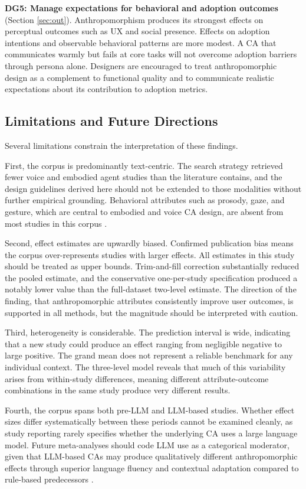 \documentclass[lettersize,journal]{IEEEtran}
\begin{document}
\textbf{DG5: Manage expectations for behavioral and adoption outcomes} (Section \ref{sec:out}). Anthropomorphism produces its strongest effects on perceptual outcomes such as UX and social presence. Effects on adoption intentions and observable behavioral patterns are more modest. A CA that communicates warmly but fails at core tasks will not overcome adoption barriers through persona alone. Designers are encouraged to treat anthropomorphic design as a complement to functional quality and to communicate realistic expectations about its contribution to adoption metrics.

\subsection{Limitations and Future Directions}

Several limitations constrain the interpretation of these findings.

First, the corpus is predominantly text-centric. The search strategy retrieved fewer voice and embodied agent studies than the literature contains, and the design guidelines derived here should not be extended to those modalities without further empirical grounding. Behavioral attributes such as prosody, gaze, and gesture, which are central to embodied and voice CA design, are absent from most studies in this corpus \cite{cassell2000embodied,bickmore2005relational}.

Second, effect estimates are upwardly biased. Confirmed publication bias means the corpus over-represents studies with larger effects. All estimates in this study should be treated as upper bounds. Trim-and-fill correction substantially reduced the pooled estimate, and the conservative one-per-study specification produced a notably lower value than the full-dataset two-level estimate. The direction of the finding, that anthropomorphic attributes consistently improve user outcomes, is supported in all methods, but the magnitude should be interpreted with caution.

Third, heterogeneity is considerable. The prediction interval is wide, indicating that a new study could produce an effect ranging from negligible negative to large positive. The grand mean does not represent a reliable benchmark for any individual context. The three-level model reveals that much of this variability arises from within-study differences, meaning different attribute-outcome combinations in the same study produce very different results.

Fourth, the corpus spans both pre-LLM and LLM-based studies. Whether effect sizes differ systematically between these periods cannot be examined cleanly, as study reporting rarely specifies whether the underlying CA uses a large language model. Future meta-analyses should code LLM use as a categorical moderator, given that LLM-based CAs may produce qualitatively different anthropomorphic effects through superior language fluency and contextual adaptation compared to rule-based predecessors \cite{amin2024chatgpt}.
\end{document}
